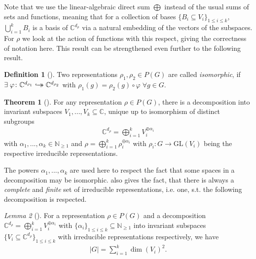 \documentclass[10pt]{amsart}
\theoremstyle{definition}
\newtheorem{theorem}{Theorem}
\newtheorem{definition}{Definition}
\theoremstyle{remark}
\newtheorem{lemma}[theorem]{Lemma}
\newcommand{\hookdoubleheadrightarrow}{%
    \hookrightarrow\mathrel{\mspace{-15mu}}\rightarrow
}
\begin{document}
    Note that we use the linear-algebraic direct sum \(\bigoplus\) instead of the usual sums of sets and functions, meaning that for a collection of bases \(\{B_i \subseteq V_i\}_{1 \leq i \leq k}\), \(\bigcup_{i=1}^k B_i\) is a basis of \(\mathbb{C}^{d_\rho}\) via a natural embedding of the vectors of the subspaces. For \(\rho\) we look at the action of functions with this respect, giving the correctness of notation here. This result can be strengthened even further to the following result.

    \begin{definition}[{\cite[p. 25]{Lomont2004}}]
        Two representations \(\rho_1, \rho_2 \in P(G)\) are called \emph{isomorphic}, if \(\exists \; \varphi\colon \mathbb{C}^{d_{\rho_1}} \hookdoubleheadrightarrow \mathbb{C}^{d_{\rho_2}}\) with \(\rho_1(g) = \rho_2(g) \circ \varphi \; \forall g \in G\).
    \end{definition}

    \begin{theorem}[{\cite[p. 7]{Fulton}}] \label{characteristics_decomposition_theorem}
        For any representation \(\rho \in P(G)\), there is a decomposition into invariant subspaces \(V_1, ..., V_k \subseteq \mathbb{C}\), unique up to isomorphism of distinct subgroups
        \begin{align}
            \mathbb{C}^{d_\rho} = \bigoplus_{i=1}^k V_i^{\oplus \alpha_i}
        \end{align}
        with \(\alpha_1, ..., \alpha_k \in \mathbb{N}_{\geq 1}\) and \(\rho = \bigoplus_{i=1}^k \rho_i^{\oplus \alpha_i}\) with \(\rho_i\colon G \to \text{GL}(V_i)\) being the respective irreducible representations.
    \end{theorem}

    The powers \(\alpha_1, ..., \alpha_k\) are used here to respect the fact that some spaces in a decomposition may be isomorphic.  also gives the fact, that there is always a \emph{complete} and \emph{finite} set of irreducible representations, i.e. one, s.t. the following decomposition is respected.

    \begin{lemma}[{\cite[p. 17]{Fulton}}] \label{characteristics_decomposition_summation_lemma}
        For a representation \(\rho \in P(G)\) and a decomposition \(\mathbb{C}^{d_\rho} = \bigoplus_{i=1}^k V_i^{\oplus \alpha_i}\) with \(\{\alpha_i\}_{1 \leq i \leq k} \subseteq \mathbb{N}_{\geq 1}\) into invariant subspaces \(\{V_i \subseteq \mathbb{C}^{d_\rho}\}_{1 \leq i \leq k}\) with irreducible representations respectively, we have
        \begin{align}
            |G| = \sum_{i=1}^k \dim(V_i)^2.
        \end{align}
    \end{lemma}
\end{document}
